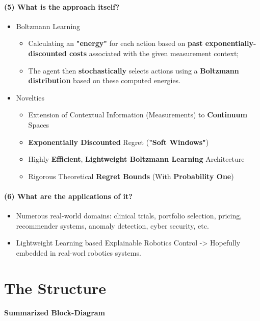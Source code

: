 \documentclass{article}
\begin{document}
\paragraph{(5) What is the approach itself?}
\begin{itemize}
  \item Boltzmann Learning
  \begin{itemize}
    \item Calculating an \textbf{"energy"} for each action based on \textbf{past exponentially-discounted costs} associated with the given measurement context;
    \item The agent then \textbf{stochastically} selects actions using a \textbf{Boltzmann distribution} based on these computed energies.
  \end{itemize}
  \item Novelties
  \begin{itemize}
    \item Extension of Contextual Information (Measurements) to \textbf{Continuum} Spaces
    \item \textbf{Exponentially Discounted} Regret (\textbf{"Soft Windows"})
    \item Highly \textbf{Efficient}, \textbf{Lightweight Boltzmann Learning} Architecture
    \item Rigorous Theoretical \textbf{Regret Bounds} (With \textbf{Probability One})
  \end{itemize}
\end{itemize}

\paragraph{(6) What are the applications of it?} 
\begin{itemize}
  \item Numerous real-world domains: clinical trials, portfolio selection, pricing, recommender systems, anomaly detection, cyber security, etc.
  \item Lightweight Learning based Explainable Robotics Control -> Hopefully embedded in real-worl robotics systems.
\end{itemize}

\section{The Structure}

\paragraph{Summarized Block-Diagram} 
\end{document}
